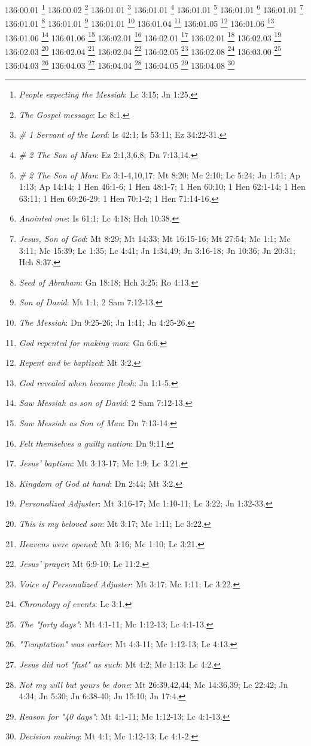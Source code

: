 {{{{{{{{{136:00.01 \footnote{\textit{People expecting the Messiah}: Lc 3:15; Jn 1:25.}
136:00.02 \footnote{\textit{The Gospel message}: Lc 8:1.}
136:01.01 \footnote{\textit{# 1 Servant of the Lord}: Is 42:1; Is 53:11; Ez 34:22-31.}
136:01.01 \footnote{\textit{# 2 The Son of Man}: Ez 2:1,3,6,8; Dn 7:13,14.}
136:01.01 \footnote{\textit{# 2 The Son of Man}: Ez 3:1-4,10,17; Mt 8:20; Mc 2:10; Lc 5:24; Jn 1:51; Ap 1:13; Ap 14:14; 1 Hen 46:1-6; 1 Hen 48:1-7; 1 Hen 60:10; 1 Hen 62:1-14; 1 Hen 63:11; 1 Hen 69:26-29; 1 Hen 70:1-2; 1 Hen 71:14-16.}
136:01.01 \footnote{\textit{Anointed one}: Is 61:1; Lc 4:18; Hch 10:38.}
136:01.01 \footnote{\textit{Jesus, Son of God}: Mt 8:29; Mt 14:33; Mt 16:15-16; Mt 27:54; Mc 1:1; Mc 3:11; Mc 15:39; Lc 1:35; Lc 4:41; Jn 1:34,49; Jn 3:16-18; Jn 10:36; Jn 20:31; Hch 8:37.}
136:01.01 \footnote{\textit{Seed of Abraham}: Gn 18:18; Hch 3:25; Ro 4:13.}
136:01.01 \footnote{\textit{Son of David}: Mt 1:1; 2 Sam 7:12-13.}
136:01.01 \footnote{\textit{The Messiah}: Dn 9:25-26; Jn 1:41; Jn 4:25-26.}
136:01.04 \footnote{\textit{God repented for making man}: Gn 6:6.}
136:01.05 \footnote{\textit{Repent and be baptized}: Mt 3:2.}
136:01.06 \footnote{\textit{God revealed when became flesh}: Jn 1:1-5.}
136:01.06 \footnote{\textit{Saw Messiah as son of David}: 2 Sam 7:12-13.}
136:01.06 \footnote{\textit{Saw Messiah as Son of Man}: Dn 7:13-14.}
136:02.01 \footnote{\textit{Felt themselves a guilty nation}: Dn 9:11.}
136:02.01 \footnote{\textit{Jesus' baptism}: Mt 3:13-17; Mc 1:9; Lc 3:21.}
136:02.01 \footnote{\textit{Kingdom of God at hand}: Dn 2:44; Mt 3:2.}
136:02.03 \footnote{\textit{Personalized Adjuster}: Mt 3:16-17; Mc 1:10-11; Lc 3:22; Jn 1:32-33.}
136:02.03 \footnote{\textit{This is my beloved son}: Mt 3:17; Mc 1:11; Lc 3:22.}
136:02.04 \footnote{\textit{Heavens were opened}: Mt 3:16; Mc 1:10; Lc 3:21.}
136:02.04 \footnote{\textit{Jesus' prayer}: Mt 6:9-10; Lc 11:2.}
136:02.05 \footnote{\textit{Voice of Personalized Adjuster}: Mt 3:17; Mc 1:11; Lc 3:22.}
136:02.08 \footnote{\textit{Chronology of events}: Lc 3:1.}
136:03.00 \footnote{\textit{The "forty days"}: Mt 4:1-11; Mc 1:12-13; Lc 4:1-13.}
136:04.03 \footnote{\textit{"Temptation" was earlier}: Mt 4:3-11; Mc 1:12-13; Lc 4:13.}
136:04.03 \footnote{\textit{Jesus did not "fast" as such}: Mt 4:2; Mc 1:13; Lc 4:2.}
136:04.04 \footnote{\textit{Not my will but yours be done}: Mt 26:39,42,44; Mc 14:36,39; Lc 22:42; Jn 4:34; Jn 5:30; Jn 6:38-40; Jn 15:10; Jn 17:4.}
136:04.05 \footnote{\textit{Reason for "40 days"}: Mt 4:1-11; Mc 1:12-13; Lc 4:1-13.}
136:04.08 \footnote{\textit{Decision making}: Mt 4:1; Mc 1:12-13; Lc 4:1-2.}
}}}}}}}}}
